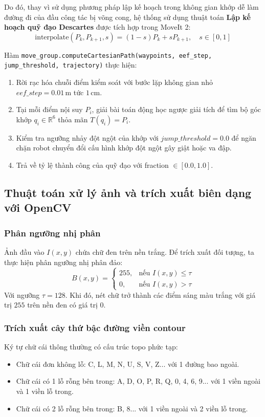 \documentclass[a4paper,12pt]{article}
\begin{document}
Do đó, thay vì sử dụng phương pháp lập kế hoạch trong không gian khớp dễ làm đường đi của đầu công tác bị võng cong, hệ thống sử dụng thuật toán \textbf{Lập kế hoạch quỹ đạo Descartes} được tích hợp trong MoveIt 2:
\begin{equation}
\text{interpolate}(P_k, P_{k+1}, s) = (1-s)P_k + sP_{k+1}, \quad s \in [0, 1]
\end{equation}

Hàm \texttt{move\_group.computeCartesianPath(waypoints, eef\_step, jump\_threshold, trajectory)} thực hiện:
\begin{enumerate}
    \item Rời rạc hóa chuỗi điểm kiểm soát với bước lặp không gian nhỏ $eef\_step = 0.01\,\text{m}$ tức $1\,\text{cm}$.
    \item Tại mỗi điểm nội suy $P_i$, giải bài toán động học ngược giải tích để tìm bộ góc khớp $q_i \in \mathbb{R}^6$ thỏa mãn $T(q_i) = P_i$.
    \item Kiểm tra ngưỡng nhảy đột ngột của khớp với $jump\_threshold = 0.0$ để ngăn chặn robot chuyển đổi cấu hình khớp đột ngột gây giật hoặc va đập.
    \item Trả về tỷ lệ thành công của quỹ đạo với fraction $\in [0.0, 1.0]$.
\end{enumerate}

\subsection{Thuật toán xử lý ảnh và trích xuất biên dạng với OpenCV}
\subsubsection{Phân ngưỡng nhị phân}
Ảnh đầu vào $I(x, y)$ chứa chữ đen trên nền trắng. Để trích xuất đối tượng, ta thực hiện phân ngưỡng nhị phân đảo:
\begin{equation}
B(x, y) = \begin{cases}
255, & \text{nếu } I(x, y) \le \tau \\
0, & \text{nếu } I(x, y) > \tau
\end{cases}
\end{equation}
Với ngưỡng $\tau = 128$. Khi đó, nét chữ trở thành các điểm sáng màu trắng với giá trị $255$ trên nền đen có giá trị $0$.

\subsubsection{Trích xuất cây thứ bậc đường viền contour}
Ký tự chữ cái thông thường có cấu trúc topo phức tạp:
\begin{itemize}[noitemsep]
    \item Chữ cái đơn không lỗ: C, L, M, N, U, S, V, Z... với 1 đường bao ngoài.
    \item Chữ cái có 1 lỗ rỗng bên trong: A, D, O, P, R, Q, 0, 4, 6, 9... với 1 viền ngoài và 1 viền lỗ trong.
    \item Chữ cái có 2 lỗ rỗng bên trong: B, 8... với 1 viền ngoài và 2 viền lỗ trong.
\end{itemize}
\end{document}
